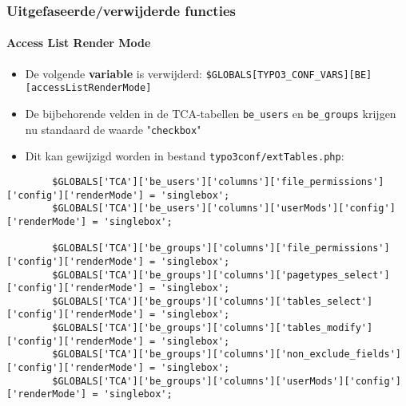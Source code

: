 \begin{frame}[fragile]
	\frametitle{Uitgefaseerde/verwijderde functies}
	\framesubtitle{Access List Render Mode}

	\lstset{basicstyle=\tiny\ttfamily}

	\begin{itemize}

		\item De volgende \textbf{variable} is verwijderd:
			\small\texttt{\$GLOBALS[TYPO3\_CONF\_VARS][BE][accessListRenderMode]}\normalsize

		\item De bijbehorende velden in de TCA-tabellen \texttt{be\_users} en \texttt{be\_groups}
			krijgen nu standaard de waarde "\texttt{checkbox}"

		\item Dit kan gewijzigd worden in bestand \texttt{typo3conf/extTables.php}:

	\end{itemize}

	\begin{lstlisting}
		$GLOBALS['TCA']['be_users']['columns']['file_permissions']['config']['renderMode'] = 'singlebox';
		$GLOBALS['TCA']['be_users']['columns']['userMods']['config']['renderMode'] = 'singlebox';

		$GLOBALS['TCA']['be_groups']['columns']['file_permissions']['config']['renderMode'] = 'singlebox';
		$GLOBALS['TCA']['be_groups']['columns']['pagetypes_select']['config']['renderMode'] = 'singlebox';
		$GLOBALS['TCA']['be_groups']['columns']['tables_select']['config']['renderMode'] = 'singlebox';
		$GLOBALS['TCA']['be_groups']['columns']['tables_modify']['config']['renderMode'] = 'singlebox';
		$GLOBALS['TCA']['be_groups']['columns']['non_exclude_fields']['config']['renderMode'] = 'singlebox';
		$GLOBALS['TCA']['be_groups']['columns']['userMods']['config']['renderMode'] = 'singlebox';
	\end{lstlisting}

\end{frame}


